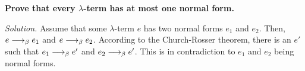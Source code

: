 \textbf{Prove that every $\lambda$-term has at most one normal form.}

\emph{Solution.} Assume that some $\lambda$-term $e$ has two normal forms $e_1$ and $e_2$. Then, $e \longrightarrow_\beta e_1$ and 
$e \longrightarrow_\beta e_2$. According to the Church-Rosser theorem, there is an $e'$ such that $e_1 \longrightarrow_\beta e'$ and
$e_2 \longrightarrow_\beta e'$. This is in contradiction to $e_1$ and $e_2$ being normal forms.
